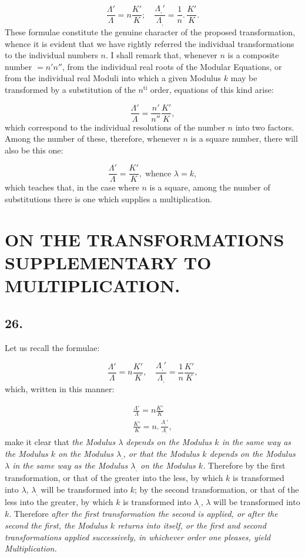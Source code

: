 \documentclass{article}
\begin{document}
\[
\frac{\Lambda'}{\Lambda}=n\frac{K'}{K};\quad\frac{\Lambda_{,}'}{\Lambda_{,}}=\frac{1}{n}.\,\frac{K'}{K}.
\]
These formulae constitute the genuine character of the proposed transformation, whence it is evident that we have rightly referred the individual transformations to the individual numbers $n$. I shall remark that, whenever $n$ is a composite number $=n'n''$, from the individual real roots of the Modular Equations, or from the individual real Moduli into which a given Modulus $k$ may be transformed by a substitution of the $n^{\mathrm{ti}}$ order, equations of this kind arise:

\[
\frac{\Lambda'}{\Lambda}=\frac{n'}{n''}\frac{K'}{K},
\]
which correspond to the individual resolutions of the number $n$ into two factors. Among the number of these, therefore, whenever $n$ is a square number, there will also be this one:

\[
\frac{\Lambda'}{\Lambda}=\frac{K'}{K},\;\text{whence }\lambda=k,
\]
which teaches that, in the case where $n$ is a square, among the number of substitutions there is one which supplies a multiplication.

\section*{ON THE TRANSFORMATIONS SUPPLEMENTARY TO MULTIPLICATION.}

\subsection*{26.}

Let us recall the formulae:

\[
\frac{\Lambda'}{\Lambda}=n\frac{K'}{K},\quad\frac{\Lambda_{,}'}{\Lambda_{,}}=\frac{1}{n}\frac{K'}{K},
\]
which, written in this manner:

\[
\begin{gathered}
\frac{\Lambda'}{\Lambda}=n\frac{K'}{K}\\[1.5ex]
\frac{K'}{K}=n.\,\frac{\Lambda_{,}'}{\Lambda_{,}},
\end{gathered}
\]
make it clear that \emph{the Modulus $\lambda$ depends on the Modulus $k$ in the same way as the Modulus $k$ on the Modulus $\lambda_{,}$, or that the Modulus $k$ depends on the Modulus $\lambda$ in the same way as the Modulus $\lambda_{,}$ on the Modulus $k$.} Therefore by the first transformation, or that of the greater into the less, by which $k$ is transformed into $\lambda$, $\lambda_{,}$ will be transformed into $k$; by the second transformation, or that of the less into the greater, by which $k$ is transformed into $\lambda_{,}$, $\lambda$ will be transformed into $k$. Therefore \emph{after the first transformation the second is applied, or after the second the first, the Modulus $k$ returns into itself, or the first and second transformations applied successively, in whichever order one pleases, yield Multiplication.}
\end{document}
